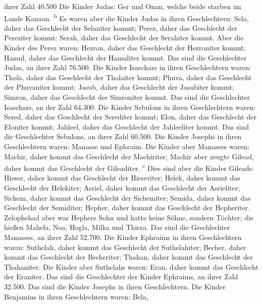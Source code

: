 ihrer Zahl 40.500  Die Kinder Judas: Ger und Onan, welche
beide starben im Lande Kanaan. \textsuperscript{b}  Es
waren aber die Kinder Judas in ihren Geschlechtern: Sela, daher das
Geschlecht der Selaniter kommt; Perez, daher das Geschlecht der
Pereziter kommt; Serah, daher das Geschlecht der Serahiter kommt.
 Aber die Kinder des Perez waren: Hezron, daher das
Geschlecht der Hezroniter kommt; Hamul, daher das Geschlecht der
Hamuliter kommt.  Das sind die Geschlechter Judas, an
ihrer Zahl 76.500.  Die Kinder Isaschars in ihren
Geschlechtern waren: Thola, daher das Geschlecht der Tholaiter kommt;
Phuva, daher das Geschlecht der Phuvaniter kommt;  Jasub,
daher das Geschlecht der Jasubiter kommt; Simron, daher das Geschlecht
der Simroniter kommt.  Das sind die Geschlechter
Isaschars, an der Zahl 64.300.  Die Kinder Sebulons in
ihren Geschlechtern waren: Sered, daher das Geschlecht der Serediter
kommt; Elon, daher das Geschlecht der Eloniter kommt; Jahleel, daher das
Geschlecht der Jahleeliter kommt.  Das sind die
Geschlechter Sebulons, an ihrer Zahl 60.500.  Die Kinder
Josephs in ihren Geschlechtern waren: Manasse und Ephraim.
 Die Kinder aber Manasses waren: Machir, daher kommt das
Geschlecht der Machiriter; Machir aber zeugte Gilead, daher kommt das
Geschlecht der Gileaditer. \textsuperscript{c}  Dies sind
aber die Kinder Gileads: Hieser, daher kommt das Geschlecht der
Hieseriter; Helek, daher kommt das Geschlecht der Helekiter;
 Asriel, daher kommt das Geschlecht der Asrieliter;
Sichem, daher kommt das Geschlecht der Sichemiter; 
Semida, daher kommt das Geschlecht der Semiditer; Hepher, daher kommt
das Geschlecht der Hepheriter.  Zelophehad aber war
Hephers Sohn und hatte keine Söhne, sondern Töchter; die hießen Mahela,
Noa, Hogla, Milka und Thirza.  Das sind die Geschlechter
Manasses, an ihrer Zahl 52.700.  Die Kinder Ephraims in
ihren Geschlechtern waren: Suthelah, daher kommt das Geschlecht der
Suthelahiter; Becher, daher kommt das Geschlecht der Becheriter; Thahan,
daher kommt das Geschlecht der Thahaniter.  Die Kinder
aber Suthelahs waren: Eran, daher kommt das Geschlecht der Eraniter.
 Das sind die Geschlechter der Kinder Ephraims, an ihrer
Zahl 32.500. Das sind die Kinder Josephs in ihren Geschlechtern.
 Die Kinder Benjamins in ihren Geschlechtern waren: Bela,
